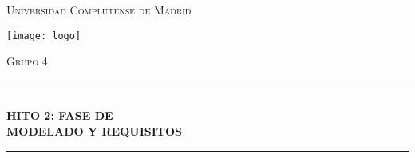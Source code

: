 \documentclass[12pt]{article}
\begin{document}
\begin{titlepage}

\newcommand{\HRule}{\rule{\linewidth}{0.5mm}} 

\center %
 
 

\textsc{\LARGE Universidad Complutense de Madrid}\\[0.1cm] %

\begin{center}
	\centering
	\texttt{[image: logo]}
\end{center}
 
 

\textsc{\LARGE Grupo 4}\\[0.1cm] %



\HRule \\[0.4cm]
{ \huge \bfseries HITO 2: FASE DE }\\[0.4cm] %
{ \huge \bfseries MODELADO Y REQUISITOS}\\[0.2cm] %
\HRule \\[1.2cm]
 


\end{titlepage}
\end{document}
